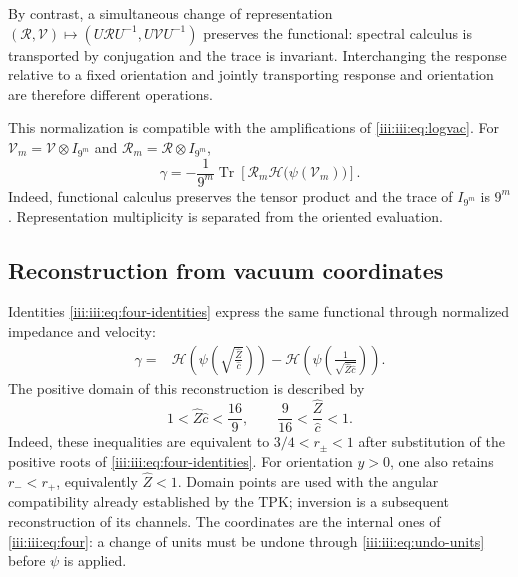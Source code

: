 By contrast, a simultaneous change of representation
$(\mathcal R,\mathcal V)\mapsto
(U\mathcal RU^{-1},U\mathcal VU^{-1})$ preserves the functional:
spectral calculus is transported by conjugation and the trace is
invariant. Interchanging the response relative to a fixed orientation
and jointly transporting response and orientation are therefore
different operations.

This normalization is compatible with the amplifications of
\eqref{iii:iii:eq:logvac}. For
$\mathcal V_m=\mathcal V\otimes I_{9^m}$ and
$\mathcal R_m=\mathcal R\otimes I_{9^m}$,
\begin{equation}
 \gamma=-\frac1{9^m}\operatorname{Tr}
 \left[\mathcal R_m\mathcal H\bigl(\psi(\mathcal V_m)\bigr)\right].
 \label{iii:iii:eq:barbero-amplification}
\end{equation}
Indeed, functional calculus preserves the tensor product and the trace
of $I_{9^m}$ is $9^m$. Representation multiplicity is separated
from the oriented evaluation.

\subsection{Reconstruction from vacuum coordinates}

Identities \eqref{iii:iii:eq:four-identities} express the same
functional through normalized impedance and velocity:
\begin{align}
 \gamma={}&
 \mathcal H\!\left(\psi\!\left(
     \sqrt{\frac{\widehat Z}{\widehat c}}\right)\right)
 -\mathcal H\!\left(\psi\!\left(
     \frac1{\sqrt{\widehat Z\widehat c}}\right)\right).
 \label{iii:iii:eq:barbero-zc}
\end{align}
The positive domain of this reconstruction is described by
\begin{equation}
 1<\widehat Z\widehat c<\frac{16}{9},\qquad
 \frac9{16}<\frac{\widehat Z}{\widehat c}<1.
 \label{iii:iii:eq:barbero-zc-domain}
\end{equation}
Indeed, these inequalities are equivalent to
$3/4<r_\pm<1$ after substitution of the positive roots of
\eqref{iii:iii:eq:four-identities}. For orientation $y>0$, one also retains
$r_-<r_+$, equivalently $\widehat Z<1$. Domain points
are used with the angular compatibility already established by
the TPK; inversion is a subsequent reconstruction of its channels.
The coordinates are the internal ones of \eqref{iii:iii:eq:four}: a change of
units must be undone through \eqref{iii:iii:eq:undo-units} before
$\psi$ is applied.


